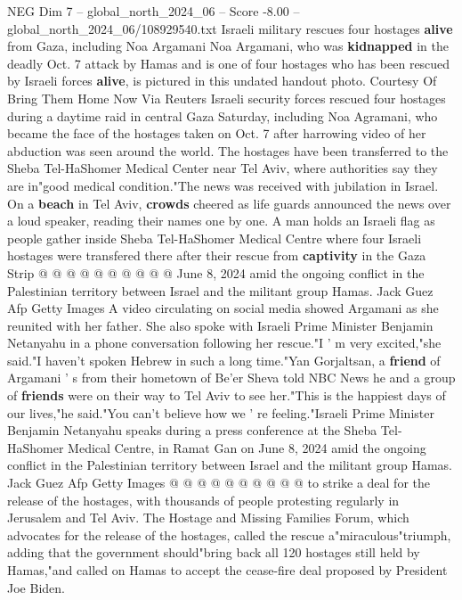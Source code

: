\begin{textsample}{NEG Dim 7 – global\_north\_2024\_06 – Score -8.00 – global\_north\_2024\_06/108929540.txt}  \label{ex:f7_neg_135}
Israeli military rescues four hostages \textbf{alive} from Gaza, including Noa Argamani Noa Argamani, who was \textbf{kidnapped} in the deadly Oct. 7 attack by Hamas and is one of four hostages who has been rescued by Israeli forces \textbf{alive}, is pictured in this undated handout photo.
Courtesy Of Bring Them Home Now Via Reuters Israeli security forces rescued four hostages during a daytime raid in central Gaza Saturday, including Noa Agramani, who became the face of the hostages taken on Oct. 7 after harrowing video of her abduction was seen around the world.
The hostages have been transferred to the Sheba Tel-HaShomer Medical Center near Tel Aviv, where authorities say they are in"good medical condition."The news was received with jubilation in Israel.
On a \textbf{beach} in Tel Aviv, \textbf{crowds} cheered as life guards announced the news over a loud speaker, reading their names one by one.
A man holds an Israeli flag as people gather inside Sheba Tel-HaShomer Medical Centre where four Israeli hostages were transfered there after their rescue from \textbf{captivity} in the Gaza Strip @ @ @ @ @ @ @ @ @ @ June 8, 2024 amid the ongoing conflict in the Palestinian territory between Israel and the militant group Hamas.
Jack Guez Afp Getty Images A video circulating on social media showed Argamani as she reunited with her father.
She also spoke with Israeli Prime Minister Benjamin Netanyahu in a phone conversation following her rescue."I ' m very excited,"she said."I haven't spoken Hebrew in such a long time."Yan Gorjaltsan, a \textbf{friend} of Argamani ' s from their hometown of Be'er Sheva told NBC News he and a group of \textbf{friends} were on their way to Tel Aviv to see her."This is the happiest days of our lives,"he said."You can't believe how we ' re feeling."Israeli Prime Minister Benjamin Netanyahu speaks during a press conference at the Sheba Tel-HaShomer Medical Centre, in Ramat Gan on June 8, 2024 amid the ongoing conflict in the Palestinian territory between Israel and the militant group Hamas.
Jack Guez Afp Getty Images @ @ @ @ @ @ @ @ @ @ to strike a deal for the release of the hostages, with thousands of people protesting regularly in Jerusalem and Tel Aviv.
The Hostage and Missing Families Forum, which advocates for the release of the hostages, called the rescue a"miraculous"triumph, adding that the government should"bring back all 120 hostages still held by Hamas,"and called on Hamas to accept the cease-fire deal proposed by President Joe Biden.

\end{textsample}
